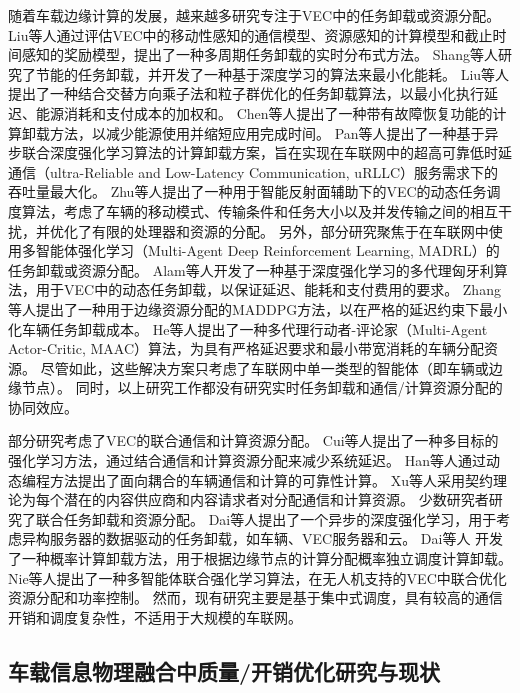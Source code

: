 随着车载边缘计算的发展，越来越多研究专注于VEC中的任务卸载或资源分配。
Liu等人\cite{liu2021rtds}通过评估VEC中的移动性感知的通信模型、资源感知的计算模型和截止时间感知的奖励模型，提出了一种多周期任务卸载的实时分布式方法。
Shang等人\cite{shang2021deep}研究了节能的任务卸载，并开发了一种基于深度学习的算法来最小化能耗。
Liu等人\cite{liu2022a}提出了一种结合交替方向乘子法和粒子群优化的任务卸载算法，以最小化执行延迟、能源消耗和支付成本的加权和。
Chen等人\cite{chen2020robust}提出了一种带有故障恢复功能的计算卸载方法，以减少能源使用并缩短应用完成时间。
Pan等人\cite{pan2022asynchronous}提出了一种基于异步联合深度强化学习算法的计算卸载方案，旨在实现在车联网中的超高可靠低时延通信（ultra-Reliable and Low-Latency Communication, uRLLC）服务需求下的吞吐量最大化。
Zhu等人\cite{zhu2022a}提出了一种用于智能反射面辅助下的VEC的动态任务调度算法，考虑了车辆的移动模式、传输条件和任务大小以及并发传输之间的相互干扰，并优化了有限的处理器和资源的分配。
另外，部分研究聚焦于在车联网中使用多智能体强化学习（Multi-Agent Deep Reinforcement Learning, MADRL）\cite{wu2020multi}的任务卸载或资源分配。
Alam等人\cite{alam2022multi}开发了一种基于深度强化学习的多代理匈牙利算法，用于VEC中的动态任务卸载，以保证延迟、能耗和支付费用的要求。
Zhang等人\cite{zhang2021adaptive}提出了一种用于边缘资源分配的MADDPG方法，以在严格的延迟约束下最小化车辆任务卸载成本。
He等人\cite{he2021efficient}提出了一种多代理行动者-评论家（Multi-Agent Actor-Critic, MAAC）算法，为具有严格延迟要求和最小带宽消耗的车辆分配资源。
尽管如此，这些解决方案只考虑了车联网中单一类型的智能体（即车辆或边缘节点）。
同时，以上研究工作都没有研究实时任务卸载和通信/计算资源分配的协同效应。

部分研究考虑了VEC的联合通信和计算资源分配。
Cui等人\cite{cui2021reinforcement}提出了一种多目标的强化学习方法，通过结合通信和计算资源分配来减少系统延迟。
Han等人\cite{han2020reliability}通过动态编程方法提出了面向耦合的车辆通信和计算的可靠性计算。
Xu等人\cite{xu2021socially}采用契约理论为每个潜在的内容供应商和内容请求者对分配通信和计算资源。
少数研究者研究了联合任务卸载和资源分配。
Dai等人\cite{dai2021asynchronous}提出了一个异步的深度强化学习，用于考虑异构服务器的数据驱动的任务卸载，如车辆、VEC服务器和云。
Dai等人 \cite{dai2022a}开发了一种概率计算卸载方法，用于根据边缘节点的计算分配概率独立调度计算卸载。
Nie等人\cite{nie2021semi}提出了一种多智能体联合强化学习算法，在无人机支持的VEC中联合优化资源分配和功率控制。
然而，现有研究主要是基于集中式调度，具有较高的通信开销和调度复杂性，不适用于大规模的车联网。

\subsection{车载信息物理融合中质量/开销优化研究与现状}

